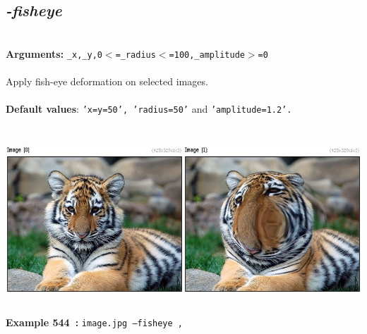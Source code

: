 \documentclass[a4paper,11pt,twoside]{book}
\begin{document}
\subsection{\emph{-fisheye} }\vspace*{-0.5em}
~\\\textbf{Arguments: } 
{\small \texttt{\_x,\_y,0$<$=\_radius$<$=100,\_amplitude$>$=0}}\\~\\
Apply fish-eye deformation on selected images.
~\\~\\\textbf{Default values}: {\small \texttt{'x=y=50', 'radius=50'} and \texttt{'amplitude=1.2'.}}
\begin{center}\includegraphics[keepaspectratio=true,height=7cm,width=\textwidth]{img/gmic_def544.jpg}\\
{\footnotesize \textbf{Example 544~:} \texttt{image.jpg --fisheye ,}}
\end{center}
\end{document}
